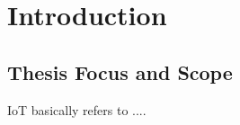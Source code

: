 \chapter{Introduction} \label{chap:int}

\section{Thesis Focus and Scope} \label{sec:focus}

IoT \cite{friis} basically refers to ....\\
